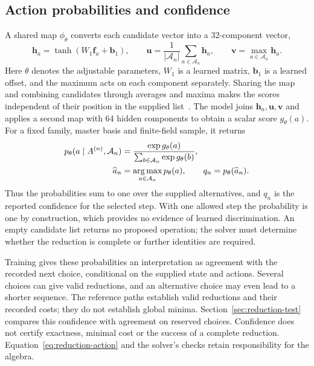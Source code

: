 \subsection{Action probabilities and confidence}
A shared map $\phi_\theta$ converts each candidate vector into a
32-component vector,
\begin{equation}
 \boldsymbol h_a=\tanh(W_1\boldsymbol f_a+\boldsymbol b_1),\qquad
 \boldsymbol u=\frac{1}{|\mathcal A_n|}
                    \sum_{a\in\mathcal A_n}\boldsymbol h_a,\qquad
 \boldsymbol v=\max_{a\in\mathcal A_n}\boldsymbol h_a .
 \label{eq:reduction-encoding}
\end{equation}
Here $\theta$ denotes the adjustable parameters, $W_1$ is a learned
matrix, $\boldsymbol b_1$ is a learned offset, and the maximum acts
on each component separately. Sharing the map and combining candidates
through averages and maxima makes the scores independent of their
position in the supplied list~\cite{DeepSets}. The model joins
$\boldsymbol h_a,\boldsymbol u,\boldsymbol v$ and applies a second
map with 64 hidden components to obtain a scalar score $g_\theta(a)$.
For a fixed family, master basis and finite-field sample, it returns
\begin{equation}
 \begin{aligned}
 p_\theta(a\mid A^{(n)},\mathcal A_n)
 &=\frac{\exp g_\theta(a)}
        {\sum_{b\in\mathcal A_n}\exp g_\theta(b)},\\
 \widehat a_n&=\mathop{\rm arg\,max}_{a\in\mathcal A_n}p_\theta(a),
 \qquad q_n=p_\theta(\widehat a_n).
 \end{aligned}
 \label{eq:reduction-choice}
\end{equation}
Thus the probabilities sum to one over the supplied alternatives,
and $q_n$ is the reported confidence for the selected step.
With one allowed step the probability is one by construction, which
provides no evidence of learned discrimination. An empty candidate
list returns no proposed operation; the solver must determine whether
the reduction is complete or further identities are required.

Training gives these probabilities an interpretation as agreement
with the recorded next choice, conditional on the supplied state and
actions. Several choices can give valid reductions, and an alternative
choice may even lead to a shorter sequence. The reference paths establish
valid reductions and their recorded costs; they do not establish global
minima. Section~\ref{sec:reduction-test} compares this confidence with agreement
on reserved choices. Confidence does not certify exactness, minimal
cost or the success of a complete reduction. Equation~\eqref{eq:reduction-action}
and the solver's checks retain responsibility for the algebra.

